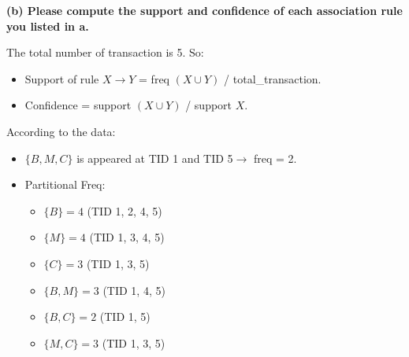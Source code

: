 \documentclass[12pt,letterpaper, onecolumn]{exam}
\begin{document}
\begin{questions}
\begin{solution}
        \textbf{(b) Please compute the support and confidence of each association rule you listed in a.}

        The total number of transaction is 5. So:

        \begin{itemize}
            \item Support of rule \( X \rightarrow Y \) = freq \( (X \cup Y) \) / total\_transaction.
            \item Confidence = support \( (X \cup Y) \) / support \( X \).
        \end{itemize}


        According to the data:

        \begin{itemize}
            \item \( \{B, M, C\} \) is appeared at TID 1 and TID 5\(\rightarrow\) freq = 2.
            \item Partitional Freq:
            \begin{itemize}
                \item \( \{B\} = 4 \) (TID 1, 2, 4, 5)
                \item \( \{M\} = 4 \) (TID 1, 3, 4, 5)
                \item \( \{C\} = 3 \) (TID 1, 3, 5)
                \item \( \{B, M\} = 3 \) (TID 1, 4, 5)
                \item \( \{B, C\} = 2 \) (TID 1, 5)
                \item \( \{M, C\} = 3 \) (TID 1, 3, 5)
            \end{itemize}
        \end{itemize}



\end{solution}
\end{questions}
\end{document}
